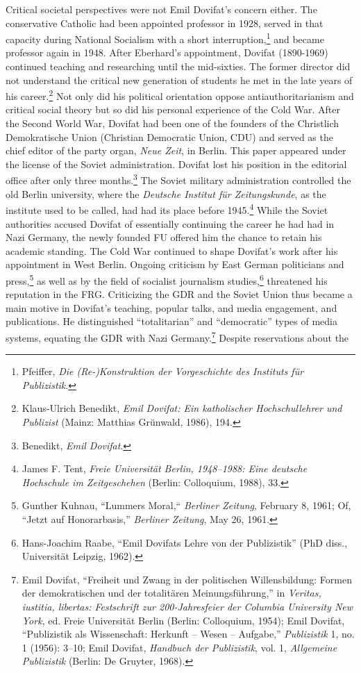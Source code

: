 \documentclass{tufte-handout}
\begin{document}
\noindent Critical societal perspectives were not Emil Dovifat's concern either.
The conservative Catholic had been appointed professor in 1928, served
in that capacity during National Socialism with a short
interruption,\footnote{Pfeiffer, \emph{Die (Re-)Konstruktion der
  Vorgeschichte des Instituts für Publizistik}.} and became professor
again in 1948. After Eberhard's appointment, Dovifat (1890-1969)
continued teaching and researching until the mid-sixties. The former
director did not understand the critical new generation of students he
met in the late years of his career.\footnote{Klaus-Ulrich Benedikt,
  \emph{Emil Dovifat: Ein katholischer Hochschullehrer und Publizist}
  (Mainz: Matthias Grünwald, 1986), 194.} Not only did his political
orientation oppose antiauthoritarianism and critical social theory but
so did his personal experience of the Cold War. After the Second World
War, Dovifat had been one of the founders of the Christlich
Demokratische Union (Christian Democratic Union, CDU) and served as the
chief editor of the party organ, \emph{Neue Zeit}, in Berlin. This paper
appeared under the license of the Soviet administration. Dovifat lost
his position in the editorial office after only three months.\footnote{Benedikt,
  \emph{Emil Dovifat}.} The Soviet military administration controlled
the old Berlin university, where the \emph{Deutsche Institut für
Zeitungskunde}, as the institute used to be called, had had its place
before 1945.\footnote{James F. Tent, \emph{Freie Universität Berlin,
  1948--1988: Eine deutsche Hochschule im Zeitgeschehen} (Berlin:
  Colloquium, 1988), 33.} While the Soviet authorities accused Dovifat
of essentially continuing the career he had had in Nazi Germany, the
newly founded FU offered him the chance to retain his academic standing.
The Cold War continued to shape Dovifat's work after his appointment in
West Berlin. Ongoing criticism by East German politicians and
press,\footnote{Gunther Kuhnau, ``Lummers Moral,`` \emph{Berliner
  Zeitung}, February 8, 1961; Of, ``Jetzt auf Honorarbasis,''
  \emph{Berliner Zeitung}, May 26, 1961.} as well as by the field of
socialist journalism studies,\footnote{Hans-Joachim Raabe, ``Emil
  Dovifats Lehre von der Publizistik'' (PhD diss., Universität Leipzig,
  1962).} threatened his reputation in the FRG. Criticizing the GDR and
the Soviet Union thus became a main motive in Dovifat's teaching,
popular talks, and media engagement, and publications. He distinguished
``totalitarian'' and ``democratic'' types of media systems, equating the
GDR with Nazi Germany.\footnote{Emil Dovifat, ``Freiheit und Zwang in
  der politischen Willensbildung: Formen der demokratischen und der
  totalitären Meinungsführung,'' in \emph{Veritas, iustitia, libertas:
  Festschrift zur 200-Jahresfeier der Columbia University New York}, ed.
  Freie Universität Berlin (Berlin: Colloquium, 1954); Emil Dovifat,
  ``Publizistik als Wissenschaft: Herkunft -- Wesen -- Aufgabe,''
  \emph{Publizistik} 1, no. 1 (1956): 3--10; Emil Dovifat,
  \emph{Handbuch der Publizistik}, vol. 1, \emph{Allgemeine Publizistik}
  (Berlin: De Gruyter, 1968).} Despite reservations about the
\end{document}
